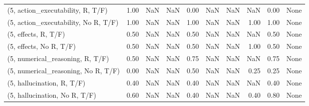 \begin{table*}[h!]
\begin{adjustbox}{width=2\columnwidth,center}
\begin{tabular}{lrrr|rrr|rrr}
(5, action\_executability, R, T/F)    &                      1.00 &                   NaN &                       NaN &                          0.00 &                       NaN &                           NaN &                                    NaN &                               0.00 &                                  None \\
(5, action\_executability, No R, T/F) &                      1.00 &                   NaN &                       NaN &                          1.00 &                       NaN &                           NaN &                                   1.00 &                               1.00 &                                  None \\
(5, effects, R, T/F)                 &                      0.50 &                   NaN &                       NaN &                          0.50 &                       NaN &                           NaN &                                    NaN &                               0.50 &                                  None \\
(5, effects, No R, T/F)              &                      0.50 &                   NaN &                       NaN &                          0.50 &                       NaN &                           NaN &                                   1.00 &                               0.50 &                                  None \\
(5, numerical\_reasoning, R, T/F)     &                      0.50 &                   NaN &                       NaN &                          0.75 &                       NaN &                           NaN &                                    NaN &                               0.75 &                                  None \\
(5, numerical\_reasoning, No R, T/F)  &                      0.00 &                   NaN &                       NaN &                          0.50 &                       NaN &                           NaN &                                   0.25 &                               0.25 &                                  None \\
(5, hallucination, R, T/F)           &                      0.40 &                   NaN &                       NaN &                          0.40 &                       NaN &                           NaN &                                    NaN &                               0.40 &                                  None \\
(5, hallucination, No R, T/F)        &                      0.60 &                   NaN &                       NaN &                          0.40 &                       NaN &                           NaN &                                   0.40 &                               0.80 &                                  None \\

\end{tabular}
\end{adjustbox}
\end{table*}
